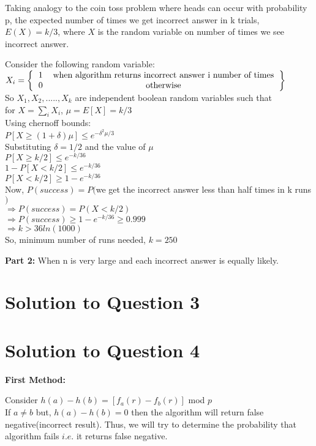 \documentclass[11pt]{article}
\begin{document}
Taking analogy to the coin toss problem where heads can occur with probability p, the expected number of times we get incorrect answer
in k trials, $E(X) = k/3$, where $X$ is the random variable on number of times we see incorrect answer.

Consider the following random variable: \\
$X_i = \left \{
\begin{tabular}{cc}
1 & when algorithm returns incorrect answer i number of times \\
0 & otherwise
\end{tabular}
\right \}$ \\
So $X_1, X_2,.....,X_k$ are independent boolean random variables such that \\
for $X = \sum_{i} X_i$, $\mu = E[X] = k/3$ \\
Using chernoff bounds: \\
$P[X \geq (1+\delta)\mu] \leq e^{-\delta^2 \mu/3}$ \\
Substituting $\delta = 1/2$ and the value of $\mu$ \\
$P[X \geq k/2] \leq e^{-k/36}$ \\
$1 - P[X < k/2] \leq e^{-k/36}$ \\
$P[X < k/2] \geq 1 - e^{-k/36}$ \\
Now, $P(success) = P($we get the incorrect answer less than half times in k runs$)$ \\
$\Rightarrow P(success) = P(X < k/2)$ \\
$\Rightarrow P(success) \geq 1 - e^{-k/36} \geq 0.999$ \\
$\Rightarrow k > 36ln(1000)$ \\
So, minimum number of runs needed, $k = 250$

\textbf{Part 2:} When n is very large and each incorrect answer is equally likely.

\section{Solution to Question 3}



\section{Solution to Question 4}

\textbf{First Method:}

Consider $h(a) - h(b) = [f_a(r) - f_b(r)]$ mod $p$ \\
If $a \neq b$ but, $h(a) - h(b) = 0$ then the algorithm will return false negative(incorrect result). Thus, we will try to determine
the probability that algorithm fails $i.e.$ it returns false negative.
\end{document}
